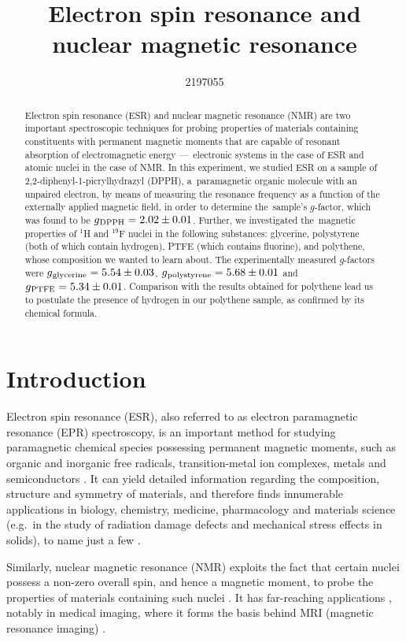 \documentclass[a4paper]{jpconf}
\numberwithin{equation}{section}
\begin{document}
\title{Electron spin resonance and nuclear magnetic resonance}
\author{2197055}

\begin{abstract}
Electron spin resonance (ESR) and nuclear magnetic resonance (NMR) are two important spectroscopic techniques for probing properties of materials containing constituents with permanent magnetic moments that are capable of resonant absorption of electromagnetic energy ---~electronic systems in the case of ESR and atomic nuclei in the case of NMR. In this experiment, we studied ESR on a sample of 2,2-diphenyl-1-picrylhydrazyl (DPPH), a~paramagnetic organic molecule with an unpaired electron, by means of measuring the resonance frequency as a function of the externally applied magnetic field, in order to determine the~sample\textquoteright s $g$-factor, which was found to be $g\textsubscript{DPPH} = 2.02 \pm 0.01$.
Further, we investigated the~magnetic properties of ${}^1$H and ${}^{19}$F nuclei in the following substances: glycerine, polystyrene (both of which contain hydrogen), PTFE (which contains fluorine), and polythene, whose composition we wanted to learn about. The experimentally measured $g$-factors were $g\textsubscript{glycerine} = 5.54 \pm 0.03$, $g\textsubscript{polystyrene} = 5.68 \pm 0.01$ and $g\textsubscript{PTFE} = 5.34 \pm 0.01$. Comparison with the results obtained for polythene lead us to postulate the presence of hydrogen in our polythene sample, as confirmed by its chemical formula.
\end{abstract}

\section{Introduction}
Electron spin resonance (ESR), also referred to as electron paramagnetic resonance (EPR) spectroscopy,      
is an important method for studying paramagnetic chemical species possessing permanent magnetic moments, such as organic and inorganic free radicals, transition-metal ion complexes, metals and semiconductors \cite{Lancaster}. It can yield detailed information regarding the composition, structure and symmetry of materials, and therefore finds innumerable applications in biology, chemistry, medicine, pharmacology and materials science (e.g.\ in the study of radiation damage defects and mechanical stress effects in solids), to name just a few \cite{Lancaster}.

Similarly, nuclear magnetic resonance (NMR) exploits the fact that certain nuclei possess a non-zero overall spin, and hence a magnetic moment, to probe the properties of materials containing such nuclei \cite{Smith}. It has far-reaching applications \cite{Gero}, notably in medical imaging, where it forms the basis behind MRI (magnetic resonance imaging) \cite{Haidekker}.
\end{document}
